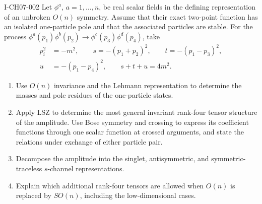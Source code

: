 \begin{exercise}{I-CH07-002}
Let $\phi^a$, $a=1,\ldots,n$, be real scalar fields in the defining
representation of an unbroken $O(n)$ symmetry.  Assume that their exact
two-point function has an isolated one-particle pole and that the associated
particles are stable.  For the process
$\phi^a(p_1)\phi^b(p_2)\to\phi^c(p_3)\phi^d(p_4)$, take
\[
\begin{aligned}
 p_i^2&=-m^2,\qquad s=-(p_1+p_2)^2,\qquad t=-(p_1-p_3)^2,\\
 u&=-(p_1-p_4)^2,\qquad s+t+u=4m^2.
\end{aligned}
\]
\begin{enumerate}[label=(\alph*)]
\item Use $O(n)$ invariance and the Lehmann representation to determine the
masses and pole residues of the one-particle states.

\item Apply LSZ to determine the most general invariant rank-four tensor
structure of the amplitude.  Use Bose symmetry and crossing to express its
coefficient functions through one scalar function at crossed arguments, and
state the relations under exchange of either particle pair.

\item Decompose the amplitude into the singlet, antisymmetric, and
symmetric-traceless $s$-channel representations.

\item Explain which additional rank-four tensors are allowed when $O(n)$ is
replaced by $SO(n)$, including the low-dimensional cases.
\end{enumerate}
\end{exercise}
